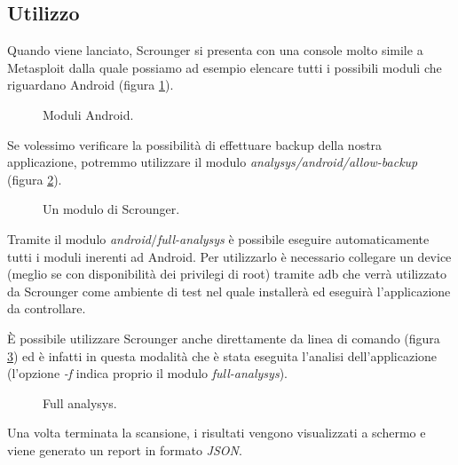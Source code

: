 \subsection{Utilizzo}
Quando viene lanciato, Scrounger si presenta con una console molto simile a Metasploit dalla quale possiamo ad esempio elencare tutti i possibili moduli che riguardano Android (figura \ref{fig:lista}).
\begin{figure}[h]
	\centering 
	\caption{Moduli Android.}
	\label{fig:lista}
\end{figure}

Se volessimo verificare la possibilità di effettuare backup della nostra applicazione, potremmo utilizzare il modulo \emph{analysys/android/allow-backup} (figura \ref{fig:example}).
\begin{figure}[h]
	\centering 
	\caption{Un modulo di Scrounger.}
	\label{fig:example}
\end{figure}

Tramite il modulo \emph{android$/$full-analysys} è possibile eseguire automaticamente tutti i moduli inerenti ad Android. Per utilizzarlo è necessario collegare un device (meglio se con disponibilità dei privilegi di root) tramite adb che verrà utilizzato da Scrounger come ambiente di test nel quale installerà ed eseguirà l'applicazione da controllare.

È possibile utilizzare Scrounger anche direttamente da linea di comando (figura \ref{fig:start}) ed è infatti in questa modalità che è stata eseguita l'analisi dell'applicazione (l'opzione \emph{-f} indica proprio il modulo \emph{full-analysys}).
\begin{figure}[h]
	\centering 
	\caption{Full analysys.}
	\label{fig:start}
\end{figure}

Una volta terminata la scansione, i risultati vengono visualizzati a schermo e viene generato un report in formato \emph{JSON}.